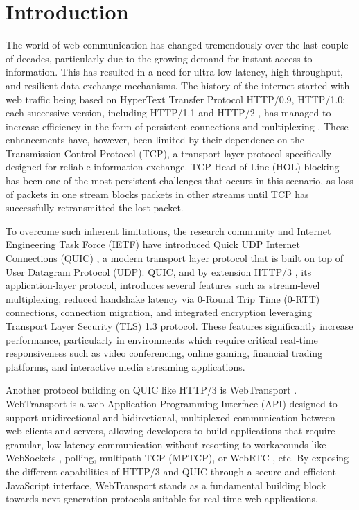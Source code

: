 
\chapter{Introduction}
\label{chap\:Introduction}

The world of web communication has changed tremendously over the last couple of decades, particularly due to the growing demand for instant access to information. This has resulted in a need for ultra-low-latency, high-throughput, and resilient data-exchange mechanisms. The history of the internet started with web traffic being based on HyperText Transfer Protocol HTTP/0.9, HTTP/1.0; each successive version, including HTTP/1.1 and HTTP/2 \cite{rfc7540}, has managed to increase efficiency in the form of persistent connections and multiplexing \cite{kurose2017}. These enhancements have, however, been limited by their dependence on the Transmission Control Protocol (TCP), a transport layer protocol specifically designed for reliable information exchange. TCP Head-of-Line (HOL) blocking has been one of the most persistent challenges that occurs in this scenario, as loss of packets in one stream blocks packets in other streams until TCP has successfully retransmitted the lost packet.

To overcome such inherent limitations, the research community and Internet Engineering Task Force (IETF) have introduced Quick UDP Internet Connections (QUIC) \cite{rfc9000}, a modern transport layer protocol that is built on top of User Datagram Protocol (UDP). QUIC, and by extension HTTP/3 \cite{rfc9114}, its application-layer protocol, introduces several features such as stream-level multiplexing, reduced handshake latency via 0-Round Trip Time (0-RTT) connections, connection migration, and integrated encryption leveraging Transport Layer Security (TLS) 1.3 protocol. These features significantly increase performance, particularly in environments which require critical real-time responsiveness such as video conferencing, online gaming, financial trading platforms, and interactive media streaming applications.

Another protocol building on QUIC like HTTP/3 is WebTransport \cite{webtransport-draft}. WebTransport \cite{webtransport-mdn} is a web Application Programming Interface (API) designed to support unidirectional and bidirectional, multiplexed communication between web clients and servers, allowing developers to build applications that require granular, low-latency communication without resorting to workarounds like WebSockets \cite{rfc6455}, polling, multipath TCP (MPTCP), or WebRTC \cite{webrtc}, etc. By exposing the different capabilities of HTTP/3 \cite{marx2021-http3} and QUIC through a secure and efficient JavaScript interface, WebTransport stands as a fundamental building block towards next-generation protocols suitable for real-time web applications.

